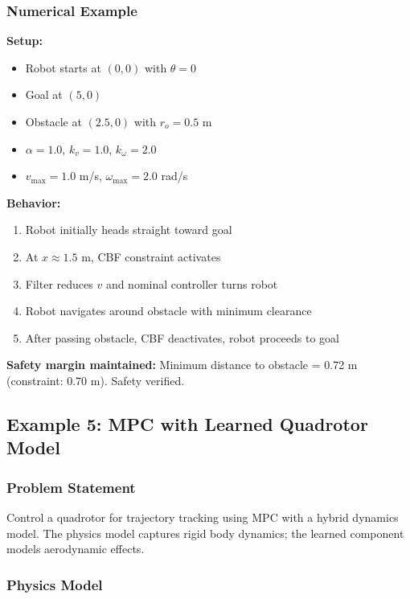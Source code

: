 \subsubsection{Numerical Example}

\textbf{Setup:}
\begin{itemize}
    \item Robot starts at $(0, 0)$ with $\theta = 0$
    \item Goal at $(5, 0)$
    \item Obstacle at $(2.5, 0)$ with $r_o = 0.5$ m
    \item $\alpha = 1.0$, $k_v = 1.0$, $k_\omega = 2.0$
    \item $v_{\max} = 1.0$ m/s, $\omega_{\max} = 2.0$ rad/s
\end{itemize}

\textbf{Behavior:}
\begin{enumerate}
    \item Robot initially heads straight toward goal
    \item At $x \approx 1.5$ m, CBF constraint activates
    \item Filter reduces $v$ and nominal controller turns robot
    \item Robot navigates around obstacle with minimum clearance
    \item After passing obstacle, CBF deactivates, robot proceeds to goal
\end{enumerate}

\textbf{Safety margin maintained:} Minimum distance to obstacle = 0.72 m (constraint: 0.70 m). Safety verified.

\subsection{Example 5: MPC with Learned Quadrotor Model}
\label{ex:mpc_quadrotor}

\subsubsection{Problem Statement}

Control a quadrotor for trajectory tracking using MPC with a hybrid dynamics model. The physics model captures rigid body dynamics; the learned component models aerodynamic effects.

\subsubsection{Physics Model}

